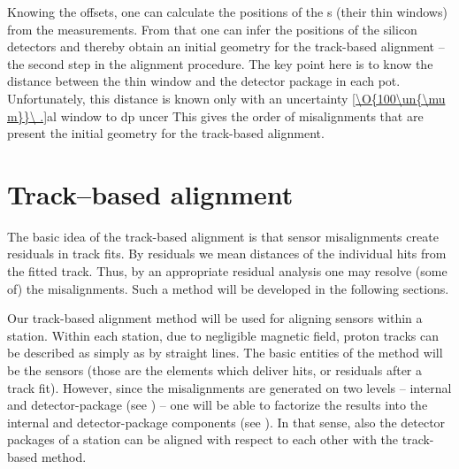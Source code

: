 


Knowing the offsets, one can calculate the positions of the s (their thin windows) from the  measurements. From that one can infer the positions of the silicon detectors and thereby obtain an initial geometry for the track-based alignment -- the second step in the alignment procedure. The key point here is to know the distance between the thin window and the detector package in each pot. Unfortunately, this distance is known only with an uncertainty
\eqref{\O{100\un{\mu m}}\ .}{al window to dp uncer}
This gives the order of misalignments that are present the initial geometry for the track-based alignment.

\section[al tb]{Track--based alignment}

The basic idea of the track-based alignment is that sensor misalignments create residuals in track fits. By residuals we mean distances of the individual hits from the fitted track. Thus, by an appropriate residual analysis one may resolve (some of) the misalignments. Such a method will be developed in the following sections.

Our track-based alignment method will be used for aligning  sensors within a station. Within each station, due to negligible magnetic field, proton tracks can be described as simply as by straight lines. The basic entities of the method will be the  sensors (those are the  elements which deliver hits, or residuals after a track fit). However, since the misalignments are generated on two levels -- internal and detector-package (see ) -- one will be able to factorize the results into the internal and detector-package components (see ). In that sense, also the detector packages of a station can be aligned with respect to each other with the track-based method.

